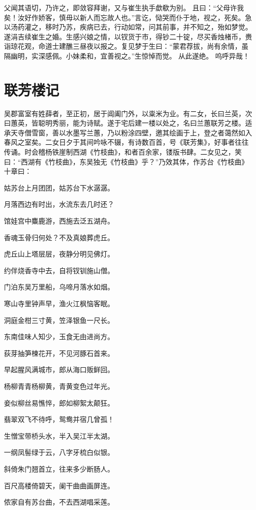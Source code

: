 \documentclass[a4paper,12pt,UTF8,twoside]{ctexbook}
\begin{document}
父闻其语切，乃许之，即敛容拜谢，又与崔生执手歔欷为别。 且曰：“父母许我矣！汝好作娇客，慎毋以新人而忘故人也。”言讫，恸哭而仆于地，视之，死矣。急以汤药灌之，移时乃苏，疾病已去，行动如常，问其前事，并不知之，殆如梦觉。 遂涓吉续崔生之婚。生感兴娘之情，以钗货于市，得钞二十锭，尽买香烛楮币，赉诣琼花观，命道士建醮三昼夜以报之。复见梦于生曰：“蒙君荐拔，尚有余情，虽隔幽明，实深感佩。小妹柔和，宜善视之。”生惊悼而觉。 从此遂绝。 呜呼异哉！

\chapter{联芳楼记}

吴郡富室有姓薛者，至正初，居于阊阖门外，以粜米为业。有二女，长曰兰英，次曰蕙英，皆聪明秀丽，能为诗赋。遂于宅后建一楼以处之，名曰兰蕙联芳之楼。适承天寺僧雪窗，善以水墨写兰蕙，乃以粉涂四壁，邀其绘画于上，登之者蔼然如入春风之室矣。二女日夕于其间吟咏不辍，有诗数百首，号《联芳集》，好事者往往传诵。时会稽杨铁崖制西湖《竹枝曲》，和者百余家，镂版书肆。二女见之，笑曰：“西湖有《竹枝曲》，东吴独无《竹枝曲》乎？”乃效其体，作苏台《竹枝曲》十章曰：

姑苏台上月团团，姑苏台下水潺潺。

月落西边有时出，水流东去几时还？

馆娃宫中麋鹿游，西施去泛五湖舟。

香魂玉骨归何处？不及真娘葬虎丘。

虎丘山上塔层层，夜静分明见佛灯。

约伴烧香寺中去，自将钗钏施山僧。

门泊东吴万里船，乌啼月落水如烟。

寒山寺里钟声早，渔火江枫恼客眠。

洞庭金柑三寸黄，笠泽银鱼一尺长。

东南佳味人知少，玉食无由进尚方。

荻芽抽笋楝花开，不见河豚石首来。

早起腥风满城市，郎从海口贩鲜回。

杨柳青青杨柳黄，青黄变色过年光。

妾似柳丝易憔悴，郎如柳絮太颠狂。

翡翠双飞不待呼，鸳鸯并宿几曾孤！

生憎宝带桥头水，半入吴江半太湖。

一纲凤髻绿于云，八字牙梳白似银。

斜倚朱门翘首立，往来多少断肠人。

百尺高楼倚碧天，阑干曲曲画屏连。

侬家自有苏台曲，不去西湖唱采莲。
\end{document}
